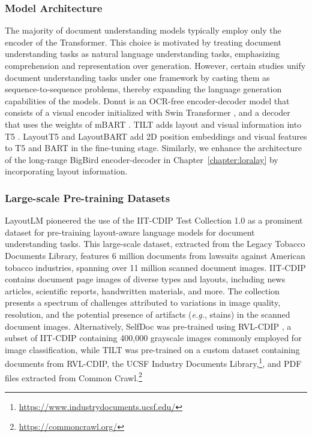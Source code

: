 \subsubsection{Model Architecture}

The majority of document understanding models typically employ only the encoder of the Transformer. This choice is motivated by treating document understanding tasks as natural language understanding tasks, emphasizing comprehension and representation over generation. However, certain studies unify document understanding tasks under one framework by casting them as sequence-to-sequence problems, thereby expanding the language generation capabilities of the models. Donut \citep{kim2022ocr} is an \ac{OCR}-free encoder-decoder model that consists of a visual encoder initialized with Swin Transformer \citep{liu2021swin}, and a decoder that uses the weights of mBART \citep{liu2020multilingual}. TILT \citep{powalski2021going} adds layout and visual information into \ac{T5} \citep{raffel2020exploring}. LayoutT5 and LayoutBART \citep{tanaka2021visualmrc} add 2D position embeddings and visual features to \ac{T5} and \ac{BART} \citep{lewis2019bart} in the fine-tuning stage. Similarly, we enhance the architecture of the long-range BigBird encoder-decoder \citep{zaheer2020big} in Chapter~\ref{chapter:loralay} by incorporating layout information.

\subsubsection{Large-scale Pre-training Datasets}
\label{section:related-document-understanding-pretraining-datasets}

LayoutLM \citep{xu2020layoutlm} pioneered the use of the IIT-CDIP Test Collection 1.0 \citep{lewis2006building} as a prominent dataset for pre-training layout-aware language models for document understanding tasks. This large-scale dataset, extracted from the Legacy Tobacco Documents Library, features 6 million documents from lawsuits against American tobacco industries, spanning over 11 million scanned document images. IIT-CDIP contains document page images of diverse types and layouts, including news articles, scientific reports, handwritten materials, and more. The collection presents a spectrum of challenges attributed to variations in image quality, resolution, and the potential presence of artifacts (\textit{e.g.}, stains) in the scanned document images. Alternatively, SelfDoc \citet{li2021selfdoc} was pre-trained using RVL-CDIP \citep{harley2015evaluation}, a subset of IIT-CDIP containing 400,000 grayscale images commonly employed for image classification, while TILT \citet{powalski2021going} was pre-trained on a custom dataset containing documents from RVL-CDIP, the UCSF Industry Documents Library,\footnote{\url{https://www.industrydocuments.ucsf.edu/}}, and PDF files extracted from Common Crawl.\footnote{\url{https://commoncrawl.org/}}

